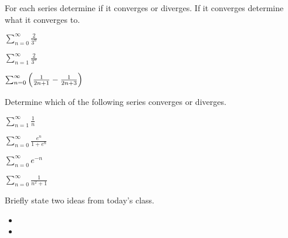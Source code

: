 
\begin{problem}
\item For each series determine if it converges or diverges. If it
  converges determine what it converges to.
  \begin{subproblem}
  \item $\sum_{n=0}^\infty \frac{2}{3^n}$
    \vfill
  \item $\sum_{n=1}^\infty \frac{2}{3^n}$
    \vfill
  \item $\sum_{n=0}^\infty \left( \frac{1}{2n+1}-\frac{1}{2n+3} \right)$
    \vfill
  \end{subproblem}
\end{problem}


\begin{problem}
\item Determine which of the following series converges or
  diverges. 
  \begin{subproblem}
    \item $\sum_{n=1}^\infty \frac{1}{n}$
      \vfill
    \item $\sum_{n=0}^\infty \frac{e^n}{1+e^n}$
      \vfill
    \item $\sum_{n=0}^\infty e^{-n}$
      \vfill
    \item $\sum_{n=0}^\infty \frac{1}{n^2+1}$
      \vfill
  \end{subproblem}
\end{problem}


\postClass

\begin{problem}
\item Briefly state two ideas from today's class.
  \begin{itemize}
  \item 
  \item 
  \end{itemize}
\item 
  \begin{subproblem}
    \item
  \end{subproblem}
\end{problem}



